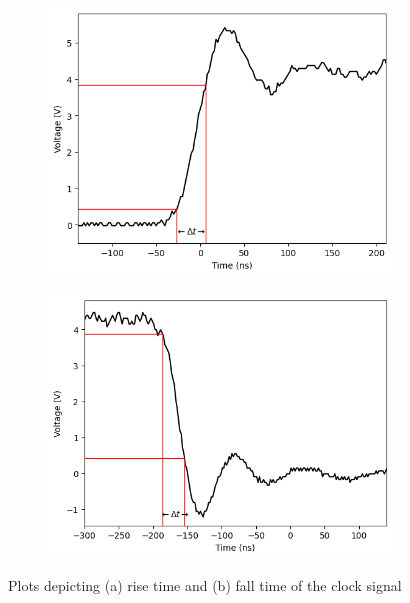 \begin{figure}[H]
    \centering
    \begin{subfigure}[b]{0.5\textwidth}
        \centering
        \includegraphics[width=\textwidth]{images/rise.png}
        \caption{}
    \end{subfigure}
    \hfill
    \begin{subfigure}[b]{0.5\textwidth}
        \centering
        \includegraphics[width=\textwidth]{images/fall.png}
        \caption{}
    \end{subfigure}
    \hfill
    \caption{Plots depicting (a) rise time and (b) fall time of the clock signal}
\end{figure}

